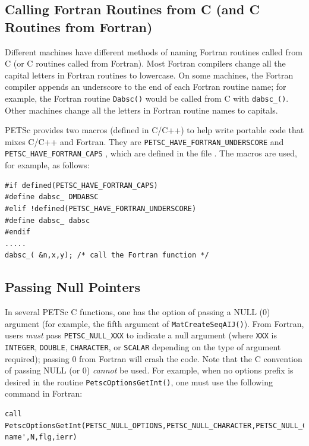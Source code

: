 {\subsection{Calling Fortran Routines from C (and C Routines from Fortran)}


Different machines have
different methods of naming Fortran routines called from C
(or C routines called from Fortran). Most Fortran compilers change
all the capital letters in Fortran routines to lowercase. On some machines, the
Fortran compiler appends an underscore to the end of each Fortran
routine name; for example, the Fortran routine \lstinline{Dabsc()}
would be called from C with \lstinline{dabsc_()}.  Other machines
change all the letters in Fortran routine names to capitals.

PETSc provides two macros (defined in C/C++) to help write
portable code that mixes C/C++ and Fortran. They are
\lstinline{PETSC_HAVE_FORTRAN_UNDERSCORE} and \lstinline{PETSC_HAVE_FORTRAN_CAPS}
 ,
which are defined in the file .
The macros are used, for example, as follows:
\begin{lstlisting}
#if defined(PETSC_HAVE_FORTRAN_CAPS)
#define dabsc_ DMDABSC
#elif !defined(PETSC_HAVE_FORTRAN_UNDERSCORE)
#define dabsc_ dabsc
#endif
.....
dabsc_( &n,x,y); /* call the Fortran function */
\end{lstlisting}


\subsection{Passing Null Pointers}

In several PETSc C functions, one has the option of passing a NULL (0)
argument (for example, the fifth argument of \lstinline{MatCreateSeqAIJ()}).
From Fortran, users {\em must} pass \lstinline{PETSC_NULL_XXX} to indicate a
null argument (where \lstinline{XXX} is \lstinline{INTEGER}, \lstinline{DOUBLE}, \lstinline{CHARACTER},
or \lstinline{SCALAR} depending on the type of argument required);
 passing  0 from
 Fortran   will crash
the code.   Note
that the C convention of passing NULL (or 0) {\em cannot}
be used.  For example, when no options prefix is desired in the
routine \lstinline{PetscOptionsGetInt()}, one must use the following command in
Fortran:
\begin{lstlisting}[breakatwhitespace=false]
call PetscOptionsGetInt(PETSC_NULL_OPTIONS,PETSC_NULL_CHARACTER,PETSC_NULL_CHARACTER,'-name',N,flg,ierr)
\end{lstlisting}

}
